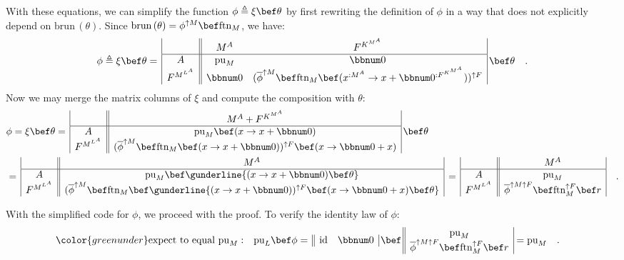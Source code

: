 With these equations, we can simplify the function $\phi\triangleq\xi\bef\theta$
by first rewriting the definition of $\phi$ in a way that does not
explicitly depend on $\text{brun}\,(\theta)$. Since $\text{brun}\,(\theta)=\phi^{\uparrow M}\bef\text{ftn}_{M}$,
we have:
\[
\phi\triangleq\xi\bef\theta=\,\begin{array}{|c||cc|}
 & M^{A} & F^{K^{M^{A}}}\\
\hline A & \text{pu}_{M} & \bbnum 0\\
F^{M^{L^{A}}} & \bbnum 0 & (\overline{\phi}^{\uparrow M}\bef\text{ftn}_{M}\bef(x^{:M^{A}}\rightarrow x+\bbnum 0^{:F^{K^{M^{A}}}}))^{\uparrow F}
\end{array}\,\bef\theta\quad.
\]
 Now we may merge the matrix columns of $\xi$ and compute the composition
with $\theta$:
\begin{align}
 & \phi=\xi\bef\theta=\,\begin{array}{|c||c|}
 & M^{A}+F^{K^{M^{A}}}\\
\hline A & \text{pu}_{M}\bef(x\rightarrow x+\bbnum 0)\\
F^{M^{L^{A}}} & (\overline{\phi}^{\uparrow M}\bef\text{ftn}_{M}\bef(x\rightarrow x+\bbnum 0))^{\uparrow F}\bef(x\rightarrow\bbnum 0+x)
\end{array}\,\bef\theta\nonumber \\
 & =\,\begin{array}{|c||c|}
 & M^{A}\\
\hline A & \text{pu}_{M}\bef\gunderline{(x\rightarrow x+\bbnum 0)\bef\theta}\\
F^{M^{L^{A}}} & (\overline{\phi}^{\uparrow M}\bef\text{ftn}_{M}\bef\gunderline{(x\rightarrow x+\bbnum 0))^{\uparrow F}\bef(x\rightarrow\bbnum 0+x)\bef\theta}
\end{array}\,=\,\begin{array}{|c||c|}
 & M^{A}\\
\hline A & \text{pu}_{M}\\
F^{M^{L^{A}}} & \overline{\phi}^{\uparrow M\uparrow F}\bef\text{ftn}_{M}^{\uparrow F}\bef r
\end{array}\quad.\label{eq:simplified-phi-free-monad-transformer-derivation1}
\end{align}

With the simplified code for $\phi$, we proceed with the proof. To
verify the identity law of $\phi$:
\begin{align*}
{\color{greenunder}\text{expect to equal }\text{pu}_{M}:}\quad & \text{pu}_{L}\bef\phi=\,\begin{array}{||cc|}
\text{id} & \bbnum 0\end{array}\,\bef\,\begin{array}{||c|}
\text{pu}_{M}\\
\overline{\phi}^{\uparrow M\uparrow F}\bef\text{ftn}_{M}^{\uparrow F}\bef r
\end{array}=\text{pu}_{M}\quad.
\end{align*}

